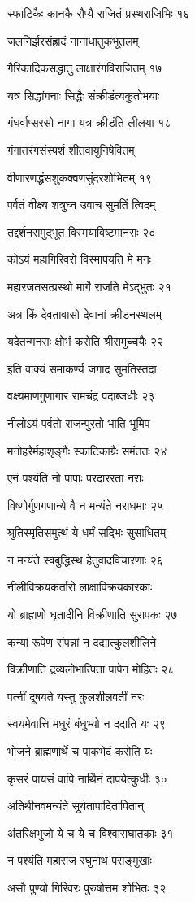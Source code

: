 स्फाटिकैः कानकै रौप्यै राजितं प्रस्थराजिभिः १६

जलनिर्झरसंह्रादं नानाधातुकभूतलम्

गैरिकादिकसद्धातु लाक्षारंगविराजितम् १७

यत्र सिद्धांगनाः सिद्धैः संक्रीडंत्यकुतोभयाः

गंधर्वाप्सरसो नागा यत्र क्रीडंति लीलया १८

गंगातरंगसंस्पर्श शीतवायुनिषेवितम्

वीणारणद्धंसशुकक्वणसुंदरशोभितम् १९

पर्वतं वीक्ष्य शत्रुघ्न उवाच सुमतिं त्विदम्

तद्दर्शनसमुद्भूत विस्मयाविष्टमानसः २०

कोऽयं महागिरिवरो विस्मापयति मे मनः

महारजतसत्प्रस्थो मार्गे राजति मेऽद्भुतः २१

अत्र किं देवतावासो देवानां क्रीडनस्थलम्

यदेतन्मनसः क्षोभं करोति श्रीसमुच्चयैः २२

इति वाक्यं समाकर्ण्य जगाद सुमतिस्तदा

वक्ष्यमाणगुणागार रामचंद्र पदाब्जधीः २३

नीलोऽयं पर्वतो राजन्पुरतो भाति भूमिप

मनोहरैर्महाशृङ्गैः स्फाटिकाग्रैः समंततः २४

एनं पश्यंति नो पापाः परदाररता नराः

विष्णोर्गुणगणान्ये वै न मन्यंते नराधमाः २५

श्रुतिस्मृतिसमुत्थं ये धर्मं सद्भिः सुसाधितम्

न मन्यंते स्वबुद्धिस्थ हेतुवादविचारणाः २६

नीलीविक्रयकर्तारो लाक्षाविक्रयकारकाः

यो ब्राह्मणो घृतादीनि विक्रीणाति सुरापकः २७

कन्यां रूपेण संपन्नां न दद्यात्कुलशीलिने

विक्रीणाति द्रव्यलोभात्पिता पापेन मोहितः २८

पत्नीं दूषयते यस्तु कुलशीलवतीं नरः

स्वयमेवात्ति मधुरं बंधुभ्यो न ददाति यः २९

भोजने ब्राह्मणार्थे च पाकभेदं करोति यः

कृसरं पायसं वापि नार्थिनं दापयेत्कुधीः ३०

अतिथीनवमन्यंते सूर्यतापादितापितान्

अंतरिक्षभुजो ये च ये च विश्वासघातकाः ३१

न पश्यंति महाराज रघुनाथ पराङ्मुखाः

असौ पुण्यो गिरिवरः पुरुषोत्तम शोभितः ३२

